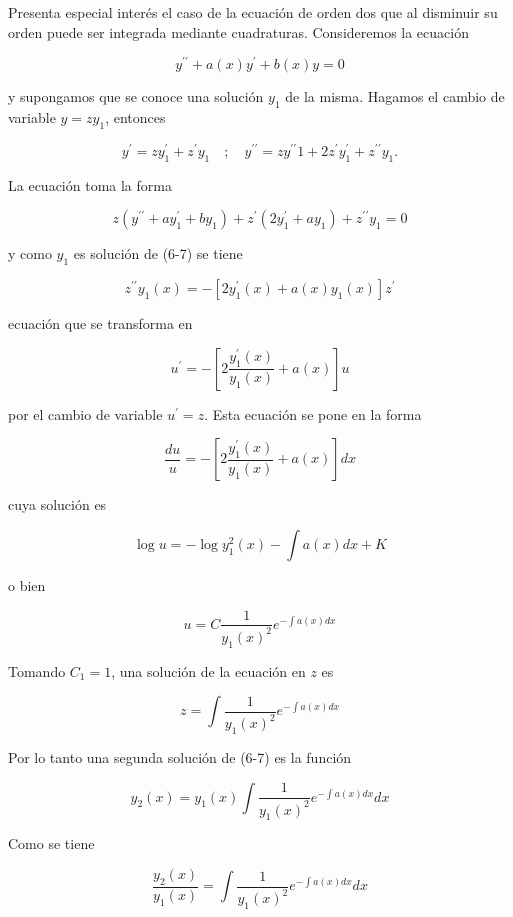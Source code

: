 \documentclass[10pt]{article}
\theoremstyle{plain}
\theoremstyle{definition}
\theoremstyle{remark}
\begin{document}
Presenta especial interés el caso de la ecuación de orden dos que al disminuir su orden puede ser integrada mediante cuadraturas. Consideremos la ecuación


\begin{equation*}
y^{\prime \prime}+a(x) y^{\prime}+b(x) y=0 \tag{$6\cdot7$}
\end{equation*}


y supongamos que se conoce una solución $y_{1}$ de la misma. Hagamos el cambio de variable $y=z y_{1}$, entonces

$$
y^{\prime}=z y_{1}^{\prime}+z^{\prime} y_{1} \quad ; \quad y^{\prime \prime}=z y^{\prime \prime} 1+2 z^{\prime} y_{1}^{\prime}+z^{\prime \prime} y_{1} .
$$

La ecuación toma la forma

$$
z\left(y^{\prime \prime}+a y_{1}^{\prime}+b y_{1}\right)+z^{\prime}\left(2 y_{1}^{\prime}+a y_{1}\right)+z^{\prime \prime} y_{1}=0
$$

y como $y_{1}$ es solución de (6-7) se tiene

$$
z^{\prime \prime} y_{1}(x)=-\left[2 y_{1}^{\prime}(x)+a(x) y_{1}(x)\right] z^{\prime}
$$

ecuación que se transforma en

$$
u^{\prime}=-\left[2 \frac{y_{1}^{\prime}(x)}{y_{1}(x)}+a(x)\right] u
$$

por el cambio de variable $u^{\prime}=z$. Esta ecuación se pone en la forma

$$
\frac{d u}{u}=-\left[2 \frac{y_{1}^{\prime}(x)}{y_{1}(x)}+a(x)\right] d x
$$

cuya solución es

$$
\log u=-\log y_{1}^{2}(x)-\int a(x) d x+K
$$

o bien

$$
u=C \frac{1}{y_{1}(x)^{2}} e^{-\int a(x) d x}
$$

Tomando $C_{1}=1$, una solución de la ecuación en $z$ es

$$
z=\int \frac{1}{y_{1}(x)^{2}} e^{-\int a(x) d x}
$$

Por lo tanto una segunda solución de (6-7) es la función


\begin{equation*}
y_{2}(x)=y_{1}(x) \int \frac{1}{y_{1}(x)^{2}} e^{-\int a(x) d x} d x \tag{$6\cdot8$}
\end{equation*}


Como se tiene

$$
\frac{y_{2}(x)}{y_{1}(x)}=\int \frac{1}{y_{1}(x)^{2}} e^{-\int a(x) d x} d x
$$
\end{document}

